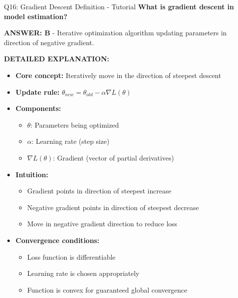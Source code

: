 \documentclass[8pt]{beamer}
\begin{document}
	
	\begin{frame}{Q16: Gradient Descent Definition - Tutorial}
		\fontsize{6.5}{7.5}\selectfont
		\textbf{What is gradient descent in model estimation?}
		
		\vspace{0.05cm}
		\textcolor{myblue}{\textbf{ANSWER: B}} - Iterative optimization algorithm updating parameters in direction of negative gradient.
		
		\vspace{0.05cm}
		\textbf{DETAILED EXPLANATION:}
		\begin{itemize}
			\item \textbf{Core concept:} Iteratively move in the direction of steepest descent
			\item \textbf{Update rule:} $\theta_{new} = \theta_{old} - \alpha \nabla L(\theta)$
			\item \textbf{Components:}
			\begin{itemize}
				\item $\theta$: Parameters being optimized
				\item $\alpha$: Learning rate (step size)
				\item $\nabla L(\theta)$: Gradient (vector of partial derivatives)
			\end{itemize}
			\item \textbf{Intuition:}
			\begin{itemize}
				\item Gradient points in direction of steepest increase
				\item Negative gradient points in direction of steepest decrease
				\item Move in negative gradient direction to reduce loss
			\end{itemize}
			\item \textbf{Convergence conditions:}
			\begin{itemize}
				\item Loss function is differentiable
				\item Learning rate is chosen appropriately
				\item Function is convex for guaranteed global convergence
			\end{itemize}
		\end{itemize}
		

\end{frame}
\end{document}
